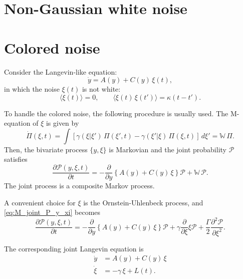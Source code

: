 \documentclass{book}
\numberwithin{equation}{section}
\theoremstyle{plain}
\theoremstyle{definition}
\theoremstyle{remark}
\begin{document}
\section{Non-Gaussian white noise}

\section{Colored noise}

Consider the Langevin-like equation:
\begin{equation}
  \dot y = A(y) + C(y) \, \xi(t),
  \label{eq:Langevin_colored}
\end{equation}
in which the noise $\xi(t)$ is not white:
\begin{equation}
\langle \xi(t) \rangle = 0,
\qquad
\langle \xi(t) \, \xi(t') \rangle = \kappa(t - t').
\label{eq:colored_noise}
\end{equation}


To handle the colored noise, the following procedure
is usually used.
%
The M-equation of $\xi$ is given by
\begin{equation}
  \dot \Pi(\xi, t)
  =
  \int \left[
    \gamma(\xi|\xi') \, \Pi(\xi', t)
    -
    \gamma(\xi'|\xi) \, \Pi(\xi, t)
  \right] \, d\xi'
  =
  \mathbb{W} \, \Pi.
\end{equation}
Then,
the bivariate process $\{ y, \xi \}$ is Markovian
and the joint probability $\mathscr P$ satisfies
\begin{equation}
  \frac{ \partial \mathscr P(y, \xi, t) }{ \partial t }
  =
  - \frac{ \partial } { \partial y }
  \left\{
    A(y) + C(y) \, \xi
  \right\} \mathscr P
  +
  \mathbb W \, \mathscr P.
  \label{eq:M_joint_P_y_xi}
\end{equation}
The joint process is a composite Markov process.


A convenient choice for $\xi$ is the Ornstein-Uhlenbeck process,
and \eqref{eq:M_joint_P_y_xi} becomes
\begin{equation}
  \frac{ \partial \mathscr P(y, \xi, t) }{ \partial t }
  =
  - \frac{ \partial } { \partial y }
  \left\{
    A(y) + C(y) \, \xi
  \right\} \mathscr P
  +
  \gamma \frac{ \partial } { \partial \xi } \xi \mathscr P
  +\frac{ \Gamma } { 2 }
  \frac{ \partial^2 \mathscr P } { \partial \xi^2 }.
  \label{eq:FP_joint_y_xi}
\end{equation}

The corresponding joint Langevin equation is
\begin{equation}
\begin{aligned}
  \dot y &= A(y) + C(y) \, \xi \\
  \dot \xi &= -\gamma \, \xi + L(t).
\end{aligned}
\label{eq:Langevin_joint_y_xi}
\end{equation}
\end{document}
